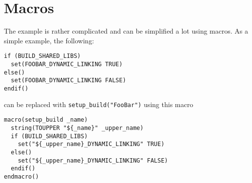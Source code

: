 \documentclass[12pt,a4wide]{article}
\begin{document}
\section{Macros}
The example is rather complicated and can be simplified a lot using
macros. As a simple example, the following:
\begin{lstlisting}
if (BUILD_SHARED_LIBS)
  set(FOOBAR_DYNAMIC_LINKING TRUE)
else()
  set(FOOBAR_DYNAMIC_LINKING FALSE)
endif()
\end{lstlisting}
can be replaced with \lstinline{setup_build("FooBar")} using this macro
\begin{lstlisting}
macro(setup_build _name)
  string(TOUPPER "${_name}" _upper_name)
  if (BUILD_SHARED_LIBS)
    set("${_upper_name}_DYNAMIC_LINKING" TRUE)
  else()
    set("${_upper_name}_DYNAMIC_LINKING" FALSE)
  endif()
endmacro()
\end{lstlisting}
\end{document}
